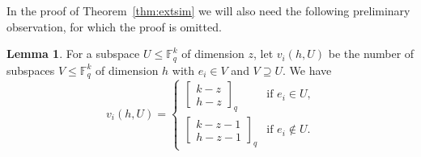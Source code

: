\documentclass[11pt,a4paper,reqno,twoside]{amsart}
\theoremstyle{definition}
\newtheorem{lemma}{Lemma}
\newcommand{\F}{\mathbb{F}}
\newcommand\qbin[3]{\left[\begin{matrix} #1 \\ #2 \end{matrix}\right]_{#3}}
\begin{document}
\begin{appendix}
In the proof of Theorem~\ref{thm:extsim} we will also need the following preliminary observation, for which the proof is omitted.
\begin{lemma}\label{lemm3}
For a subspace $U \le \F_q^k$ of dimension $z$, 
let $v_i(h,U)$ be the number of subspaces $V \le \F_q^k$ of dimension $h$ with $e_i \in V$ and $V \supseteq U$.
We have
$$v_i(h,U)= \begin{cases} \displaystyle
     \qbin{k-z}{h-z}{q} & \mbox{if $e_i \in U$,} \\ \displaystyle
      \qbin{k-z-1}{h-z-1}{q} & \mbox{if $e_i \notin U$.}
 \end{cases}$$
\end{lemma}

\end{appendix}
\end{document}
